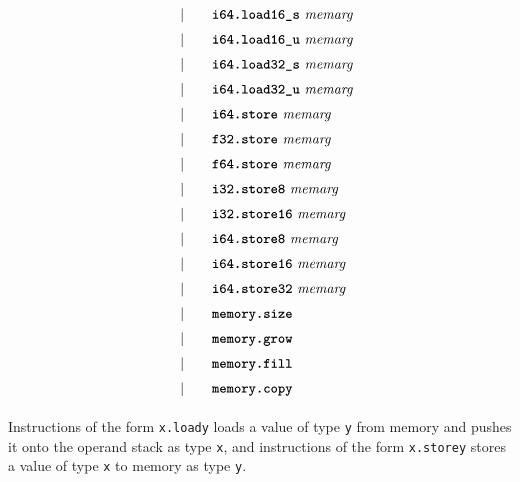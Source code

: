 \begin{alignat*}{9}
    &&       &&\quad | &\quad && \textbf{\texttt{i64.load16\textunderscore s}}\ \textit{memarg} \quad &&  \\[1mm]
    &&       &&\quad | &\quad && \textbf{\texttt{i64.load16\textunderscore u}}\ \textit{memarg} \quad &&  \\[1mm]
    &&       &&\quad | &\quad && \textbf{\texttt{i64.load32\textunderscore s}}\ \textit{memarg} \quad &&  \\[1mm]
    &&       &&\quad | &\quad && \textbf{\texttt{i64.load32\textunderscore u}}\ \textit{memarg} \quad &&  \\[1mm]
    &&       &&\quad | &\quad && \textbf{\texttt{i64.store}}\ \textit{memarg} \quad &&  \\[1mm]
    &&       &&\quad | &\quad && \textbf{\texttt{f32.store}}\ \textit{memarg} \quad &&  \\[1mm]
    &&       &&\quad | &\quad && \textbf{\texttt{f64.store}}\ \textit{memarg} \quad &&  \\[1mm]
    &&       &&\quad | &\quad && \textbf{\texttt{i32.store8}}\ \textit{memarg} \quad &&  \\[1mm]
    &&       &&\quad | &\quad && \textbf{\texttt{i32.store16}}\ \textit{memarg} \quad &&  \\[1mm]
    &&       &&\quad | &\quad && \textbf{\texttt{i64.store8}}\ \textit{memarg} \quad &&  \\[1mm]
    &&       &&\quad | &\quad && \textbf{\texttt{i64.store16}}\ \textit{memarg} \quad &&  \\[1mm]
    &&       &&\quad | &\quad && \textbf{\texttt{i64.store32}}\ \textit{memarg} \quad &&  \\[1mm]
    &&       &&\quad | &\quad && \textbf{\texttt{memory.size}}\ \quad &&  \\[1mm]
    &&       &&\quad | &\quad && \textbf{\texttt{memory.grow}}\ \quad &&  \\[1mm]
    &&       &&\quad | &\quad && \textbf{\texttt{memory.fill}}\ \quad &&  \\[1mm]
    &&       &&\quad | &\quad && \textbf{\texttt{memory.copy}}\ \quad &&  \\[1mm]
\end{alignat*}

Instructions of the form \texttt{x.loady} loads a value of type \texttt{y} from memory and pushes it onto the operand stack as type \texttt{x}, and instructions of the form \texttt{x.storey} stores a value of type \texttt{x} to memory as type \texttt{y}. \vspace{1em}

